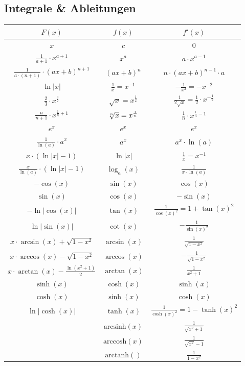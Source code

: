 \subsection{Integrale \& Ableitungen}

{\small
\begin{center}
    \begin{tabular}{c||c||c}
        $F(x)$ & $f(x)$ & $f'(x)$  \\
        \hline
        \hline
        $x$ & $c$ & $0$\\
        $\frac{1}{a+1}\cdot x^{a+1}$ & $x^a$ & $a\cdot x^{a-1}$\\
        $\frac{1}{a\cdot(n+1)}\cdot(ax+b)^{n+1}$ & $(ax+b)^n$ & $n \cdot(ax+b)^{n-1}\cdot a$\\
        $\ln|x|$ & $\frac{1}{x}=x^{-1}$ & $-\frac{1}{x^2} = -x^{-2}$\\
        $\frac{2}{3}\cdot x^{\frac{3}{2}}$    & $\sqrt{x} = x^{\frac{1}{2}}$ & $\frac{1}{2\sqrt{x}} = \frac{1}{2}\cdot x^{-\frac{1}{2}}$\\
        $\frac{n}{n+1}\cdot x^{\frac{1}{n}+1}$ & $\sqrt[\leftroot{0} n]{x} = x^\frac{1}{n}$ & $\frac{1}{n}\cdot x^{\frac{1}{n}-1}$\\
        \hline
        $e^x$ & $e^x$ & $e^x$\\
        $\frac{1}{\ln(a)}\cdot a^x$ & $a^x$ & $a^x\cdot \ln(a)$\\
        $x\cdot (\ln|x|-1)$ & $\ln|x|$ & $\frac{1}{x} = x^{-1}$\\
        $\frac{x}{\ln(a)}\cdot(\ln|x|-1)$ & $\log_a(x)$ & $\frac{1}{x\cdot\ln(a)}$\\
        \hline
        $-\cos(x)$ & $\sin(x)$ & $\cos(x)$\\
        $\sin(x)$ & $\cos(x)$ & $-\sin(x)$\\
        $-\ln|\cos(x)|$ & $\tan(x)$ & $\frac{1}{\cos(x)^2}= 1 + \tan(x)^2$\\
        $\ln|\sin(x)|$ & $\cot(x)$ & $-\frac{1}{\sin(x)^2}$\\
        $x \cdot\arcsin(x) + \sqrt{1 - x^2}$ & $\arcsin(x)$ & $\frac{1}{\sqrt{1-x^2}}$\\
        $x \cdot \arccos(x)-\sqrt{1-x^2}$ & $\arccos(x)$ & $-\frac{1}{\sqrt{1-x^2}}$\\
        $x \cdot \arctan(x)-\frac{\ln(x^2+1)}{2}$ & $\arctan(x)$ & $\frac{1}{x^2+1}$\\
        \hline
        $\sinh(x)$      & $\cosh(x)$ & $\sinh(x)$\\
        $\cosh(x)$      & $\sinh(x)$ & $\cosh(x)$\\
        $\ln|\cosh(x)|$ & $\tanh(x)$ & $\frac{1}{\cosh(x)^2} = 1-\tanh(x)^2$\\
        & $\text{arcsinh}(x)$ & $\frac{1}{\sqrt{x^2+1}}$\\
        & $\text{arccosh}(x)$ & $\frac{1}{\sqrt{x^2}-1}$\\
        & $\text{arctanh}()$  & $\frac{1}{1-x^2}$\\
        \hline
    \end{tabular}
\end{center}
}

